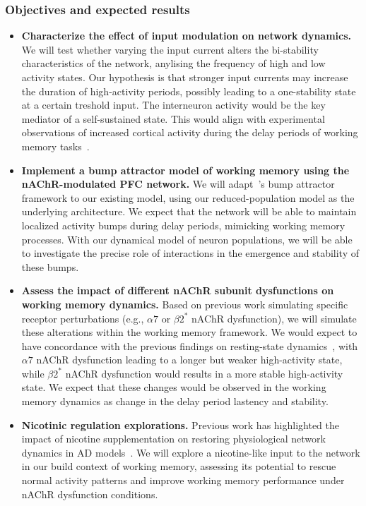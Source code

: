 \documentclass[11pt,a4paper]{article}
\begin{document}
\subsubsection*{Objectives and expected results}
\begin{itemize}
  \item \textbf{Characterize the effect of input modulation on network dynamics.} We will test whether varying the input current alters the bi-stability characteristics of the network, anylising the frequency of high and low activity states. Our hypothesis is that stronger input currents may increase the duration of high-activity periods, possibly leading to a one-stability state at a certain treshold input. The interneuron activity would be the key mediator of a self-sustained state. This would align with experimental observations of increased cortical activity during the delay periods of working memory tasks~\cite{Funahashi2006}.
  
  \item \textbf{Implement a bump attractor model of working memory using the nAChR-modulated PFC network.} We will adapt~\cite{Barbosa2020}'s bump attractor framework to our existing model, using our reduced-population model as the underlying architecture. We expect that the network will be able to maintain localized activity bumps during delay periods, mimicking working memory processes. With our dynamical model of neuron populations, we will be able to investigate the precise role of interactions in the emergence and stability of these bumps.

  \item \textbf{Assess the impact of different nAChR subunit dysfunctions on working memory dynamics.} Based on previous work simulating specific receptor perturbations (e.g., $\alpha7$ or $\beta2^*$ nAChR dysfunction), we will simulate these alterations within the working memory framework. We would expect to have concordance with the previous findings on resting-state dynamics~\cite{Rooy2021}, with $\alpha7$ nAChR dysfunction leading to a longer but weaker high-activity state, while $\beta2^*$ nAChR dysfunction would results in a more stable high-activity state. We expect that these changes would be observed in the working memory dynamics as change in the delay period lastency and stability.
  \item \textbf{Nicotinic regulation explorations.} Previous work has highlighted the impact of nicotine supplementation on restoring physiological network dynamics in AD models~\cite{Koukouli2017}. We will explore a nicotine-like input to the network in our build context of working memory, assessing its potential to rescue normal activity patterns and improve working memory performance under nAChR dysfunction conditions.
\end{itemize}


\printbibliography[]
\end{document}
